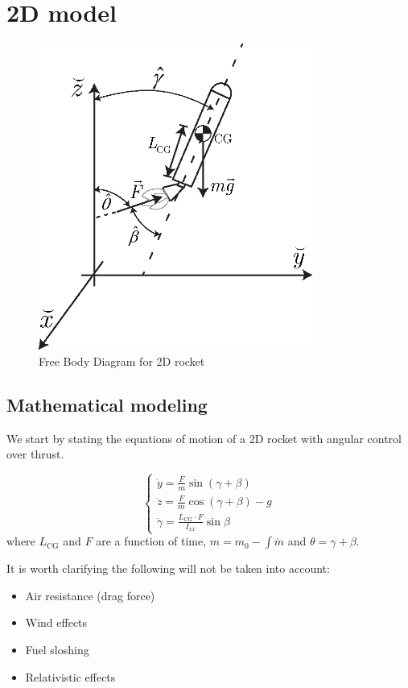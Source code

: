 \documentclass[11pt, titlepage]{article}
\begin{document}



\clearpage
\section{2D model}
\newcommand{\CG}{{\mathrm{CG}}}
\newcommand{\LCG}{L_\CG}
\begin{figure}[htb!]
	\centering
	\includegraphics[width=9cm]{fig/rocketFBD.eps}
	\caption{Free Body Diagram for 2D rocket}
\end{figure}

\subsection{Mathematical modeling}
We start by stating the equations of motion of a 2D rocket with angular control over thrust.

\[
\left\{
\begin{array}{l}
	\ddot{y}=\frac{F}{m} \sin(\gamma+\beta) \\
	\ddot{z}=\frac{F}{m} \cos (\gamma+\beta)-g \\
	\ddot{\gamma} = \frac{L_{\CG}\cdot F}{I_{xx}}\sin\beta
\end{array}
\right.
\]
where \(\LCG\) and \(F\) are a function of time, $m =m_0 - \int \dot{m} $ and $\theta = \gamma+\beta$. 

It is worth clarifying the following will not be taken into account:
\begin{itemize}
	\item Air resistance (drag force)
	\item Wind effects
	\item Fuel sloshing
	\item Relativistic effects
\end{itemize}
\end{document}

